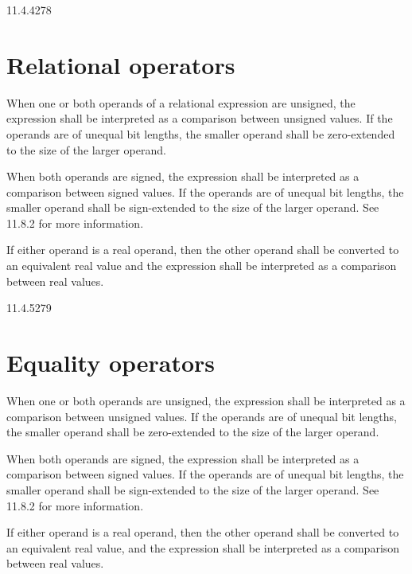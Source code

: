\documentclass{article}
\newcommand{\del}{\color{darkred}}
\begin{document}
\begin{lrmquote}{11.4.4}{278}
  \section{Relational operators}

  \textelp{}

  When one or both operands of a relational expression are unsigned, the
  expression shall be interpreted as a comparison between unsigned values.
    {
      \del
      If the operands are of unequal bit lengths, the smaller operand
      shall be zero-extended to the size of the larger operand.
    }

  When both operands are signed, the expression shall be interpreted as a
  comparison between signed values.
    {
      \del{}
      If the operands are of unequal bit
      lengths, the smaller operand shall be sign-extended to the size of the larger
      operand. See 11.8.2 for more information.
    }

  If either operand is a real operand, then the other operand shall be converted to
  an equivalent real value and the expression shall be interpreted as a comparison
  between real values.

  \textelp{}
\end{lrmquote}

\begin{lrmquote}{11.4.5}{279}
  \section{Equality operators}

  \textelp{}

  When one or both operands are unsigned, the expression shall be interpreted as a
  comparison between unsigned values.
    {
      \del{}
      If the operands are of unequal bit
      lengths, the smaller operand shall be zero-extended to the size of the larger
      operand.
    }

  When both operands are signed, the expression shall be interpreted as a
  comparison between signed values.
    {
      \del{}
      If the operands are of unequal bit
      lengths, the smaller operand shall be sign-extended to the size of the larger
      operand. See 11.8.2 for more information.
    }

  If either operand is a real operand, then the other operand shall be converted
  to an equivalent real value, and the expression shall be interpreted as a
  comparison between real values.

  \textelp{}
\end{lrmquote}
\end{document}
